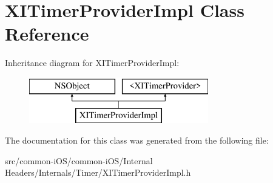 \hypertarget{interface_x_i_timer_provider_impl}{}\section{X\+I\+Timer\+Provider\+Impl Class Reference}
\label{interface_x_i_timer_provider_impl}
Inheritance diagram for X\+I\+Timer\+Provider\+Impl\+:\begin{figure}[H]
\begin{center}
\leavevmode
\includegraphics[height=2.000000cm]{interface_x_i_timer_provider_impl}
\end{center}
\end{figure}


The documentation for this class was generated from the following file\+:\begin{DoxyCompactItemize}
\item 
src/common-\/i\+O\+S/common-\/i\+O\+S/\+Internal Headers/\+Internals/\+Timer/X\+I\+Timer\+Provider\+Impl.\+h\end{DoxyCompactItemize}
